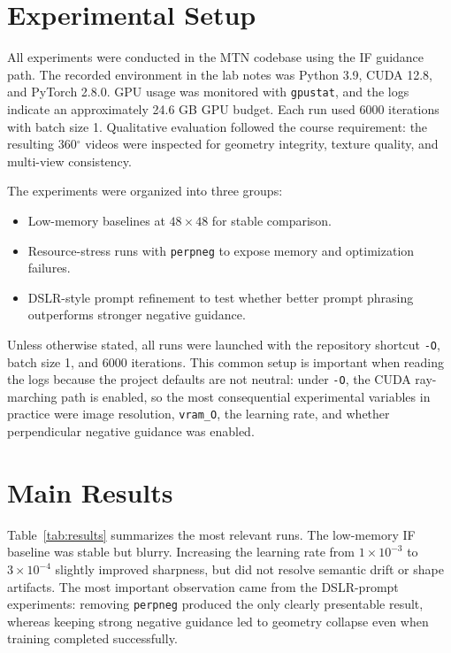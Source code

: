 \documentclass[sigconf,nonacm]{acmart}
\begin{document}
\section{Experimental Setup}
All experiments were conducted in the MTN codebase \cite{texaser-mtn-repo} using the IF guidance path. The recorded environment in the lab notes was Python 3.9, CUDA 12.8, and PyTorch 2.8.0. GPU usage was monitored with \texttt{gpustat}, and the logs indicate an approximately 24.6 GB GPU budget. Each run used 6000 iterations with batch size 1. Qualitative evaluation followed the course requirement: the resulting 360$^{\circ}$ videos were inspected for geometry integrity, texture quality, and multi-view consistency.

The experiments were organized into three groups:
\begin{itemize}
    \item Low-memory baselines at $48\times 48$ for stable comparison.
    \item Resource-stress runs with \texttt{perpneg} to expose memory and optimization failures.
    \item DSLR-style prompt refinement to test whether better prompt phrasing outperforms stronger negative guidance.
\end{itemize}

Unless otherwise stated, all runs were launched with the repository shortcut \texttt{-O}, batch size 1, and 6000 iterations. This common setup is important when reading the logs because the project defaults are not neutral: under \texttt{-O}, the CUDA ray-marching path is enabled, so the most consequential experimental variables in practice were image resolution, \texttt{vram\_O}, the learning rate, and whether perpendicular negative guidance was enabled.

\section{Main Results}
Table~\ref{tab:results} summarizes the most relevant runs. The low-memory IF baseline was stable but blurry. Increasing the learning rate from $1\times 10^{-3}$ to $3\times 10^{-4}$ slightly improved sharpness, but did not resolve semantic drift or shape artifacts. The most important observation came from the DSLR-prompt experiments: removing \texttt{perpneg} produced the only clearly presentable result, whereas keeping strong negative guidance led to geometry collapse even when training completed successfully.
\end{document}
